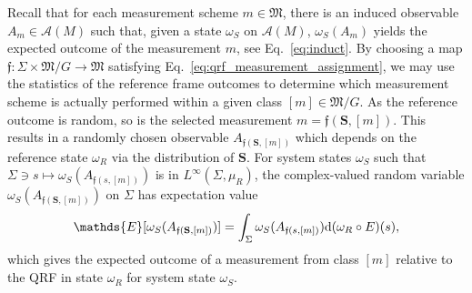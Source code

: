 \documentclass[sn-mathphys-num]{sn-jnl}%
\newcommand{\Af}{\mathscr{A}}
\newcommand{\diff}{\textup{d}}
\numberwithin{equation}{section}
\theoremstyle{thmstyleone}%
\theoremstyle{thmstyletwo}%
\theoremstyle{thmstylethree}%
\begin{document}
Recall that for each measurement scheme $m\in\mathfrak{M}$, there is an induced observable $A_m\in\Af(M)$ such that, given a state $\omega_S$ on $\Af(M)$, $\omega_S(A_m)$ yields the expected outcome of the measurement $m$, see Eq.~\eqref{eq:induct}. By choosing a map $\mathfrak{f}:\Sigma\times \mathfrak{M}/G\to \mathfrak{M}$ satisfying Eq.\ \eqref{eq:qrf_measurement_assignment}, 
we may use the statistics of the reference frame outcomes to determine which measurement scheme is actually performed within a given class $[m]\in\mathfrak{M}/G$. As the reference outcome is random, so is the selected measurement $m=\mathfrak{f}(\mathbf{S},[m])$. This results in a randomly chosen observable $A_{\mathfrak{f}(\mathbf{S},[m])}$ which depends on the reference state $\omega_R$
via the distribution of $\mathbf{S}$. For system states $\omega_S$ such that $\Sigma\ni s\mapsto \omega_S(A_{\mathfrak{f}(s,[m])})$ is
in $L^\infty(\Sigma,\mu_R)$, the complex-valued random variable 
$\omega_S(A_{\mathfrak{f}(\mathbf{S},[m])})$ on $\Sigma$ has expectation value
\begin{equation}
    \label{eq:rel_exp}
    \mathds{E}[\omega_S(A_{\mathfrak{f}(\mathbf{S},[m])})]=\int_\Sigma \omega_S(A_{\mathfrak{f}(s,[m])})\diff(\omega_R\circ E)(s),
\end{equation}
which gives the expected outcome of a measurement from class $[m]$
relative to the QRF in state $\omega_R$ for system state $\omega_S$.
\end{document}
